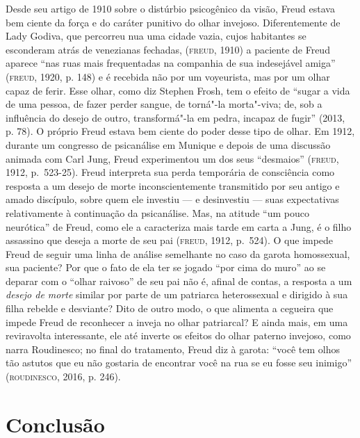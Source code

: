 Desde seu artigo de 1910 sobre o distúrbio psicogênico da visão, Freud
estava bem ciente da força e do caráter punitivo do olhar invejoso.
Diferentemente de Lady Godiva, que percorreu nua uma cidade vazia, cujos
habitantes se esconderam atrás de venezianas fechadas, (\textsc{freud}, 1910) a
paciente de Freud aparece ``nas ruas mais frequentadas na companhia de
sua indesejável amiga'' (\textsc{freud}, 1920, p. 148) e é recebida não por um
voyeurista, mas por um olhar capaz de ferir. Esse olhar, como diz
Stephen Frosh, tem o efeito de ``sugar a vida de uma pessoa, de fazer
perder sangue, de torná"-la morta"-viva; de, sob a influência do desejo de
outro, transformá"-la em pedra, incapaz de fugir'' (2013, p. 78). O
próprio Freud estava bem ciente do poder desse tipo de olhar. Em 1912,
durante um congresso de psicanálise em Munique e depois de uma discussão
animada com Carl Jung, Freud experimentou um dos seus ``desmaios'' (\textsc{freud},
1912, p.~523-25). Freud interpreta sua perda temporária de consciência como
resposta a um desejo de morte inconscientemente transmitido por seu
antigo e amado discípulo, sobre quem ele investiu --- e desinvestiu ---
suas expectativas relativamente à continuação da psicanálise. Mas, na
atitude ``um pouco neurótica'' de Freud, como ele a caracteriza mais tarde
em carta a Jung, é o filho assassino que deseja a morte de seu pai
(\textsc{freud}, 1912, p.~524). O que impede Freud de seguir uma linha de análise
semelhante no caso da garota homossexual, sua paciente? Por que o fato
de ela ter se jogado ``por cima do muro'' ao se deparar com o ``olhar
raivoso'' de seu pai não é, afinal de contas, a resposta a um
\emph{desejo de morte} similar por parte de um patriarca heterossexual e
dirigido à sua filha rebelde e desviante? Dito de outro modo, o que
alimenta a cegueira que impede Freud de reconhecer a inveja no olhar
patriarcal? E ainda mais, em uma reviravolta interessante, ele até
inverte os efeitos do olhar paterno invejoso, como narra Roudinesco; no
final do tratamento, Freud diz à garota: ``você tem olhos tão astutos
que eu não gostaria de encontrar você na rua se eu fosse seu inimigo''
(\textsc{roudinesco}, 2016, p. 246).

\section{Conclusão}

